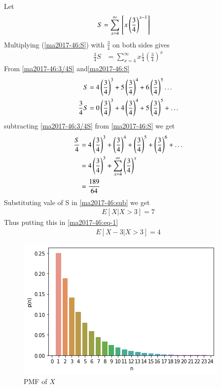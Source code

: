 Let
\begin{align}\label{ma2017-46:S}
S&=\sum_{x=4}^{\infty} {}\left[ x \left(\frac{3}{4}\right)^{x-1}\right]\
\end{align}
Multiplying (\eqref{ma2017-46:S}) with  $\frac{3}{4}$ on both sides gives
\begin{align}\label{ma2017-46:3/4S}
\frac{3}{4}S&=\sum_{x=4}^{\infty} x\frac{1}{4}\left(\frac{3}{4}\right)^{x} 
\end{align}
From \eqref{ma2017-46:3/4S} and\eqref{ma2017-46:S} 
\begin{align}
S&= 4 \left(\frac{3}{4}\right)^{3}+5 \left(\frac{3}{4}\right)^{4}+6 \left(\frac{3}{4}\right)^{5}\ldots\\
\frac{3}{4}S&= 0\left(\frac{3}{4}\right)^{3}+ 4 \left(\frac{3}{4}\right)^{4}+5 \left(\frac{3}{4}\right)^{5}+\ldots
\end{align}
subtracting \eqref{ma2017-46:3/4S} from \eqref{ma2017-46:S} we get
\begin{align}
\frac{S}{4}&= 4 \left(\frac{3}{4}\right)^{3}+ \left(\frac{3}{4}\right)^{4}+\left(\frac{3}{4}\right)^{5}+\left(\frac{3}{4}\right)^{6}+\ldots\\
&=4 \left(\frac{3}{4}\right)^{3}+\sum_{x=4}^{\infty}   \left(\frac{3}{4}\right)^{x}\\
&=\frac{189}{64}
\end{align}
Substituting vale of S in \eqref{ma2017-46:sub} we get
\begin{align}
    E[X|X>3]=7
\end{align}
Thus putting this in \eqref{ma2017-46:eq-1}
\begin{align}
    E[X-3|X>3]=4
\end{align}
\begin{figure}[h]
    \centering
    \includegraphics[width=\columnwidth]{solutions/ma/2017/46/figures/plot.png}
    \caption{PMF of $X$  }
    \label{ma2017-46:beta}
\end{figure}


